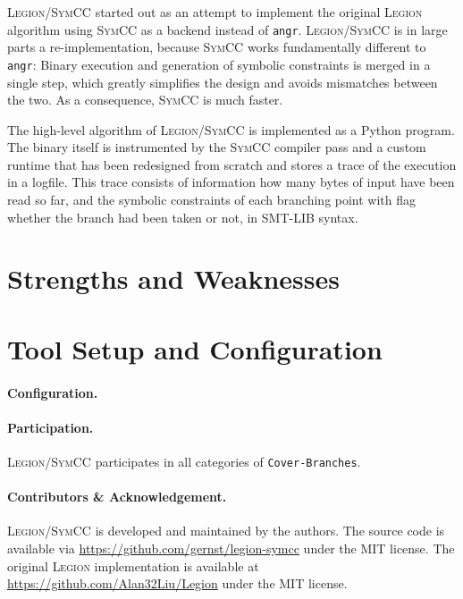 \documentclass{llncs}
\newcommand{\code}[1]{\texttt{#1}}
\newcommand{\Legion}{\textsc{Legion}\xspace}
\newcommand{\SymCC}{\textsc{SymCC}\xspace}
\newcommand{\Angr}{\texttt{angr}\xspace}
\begin{document}
\Legion/\SymCC started out as an attempt to implement the original \Legion algorithm 
using \SymCC as a backend instead of \Angr.
\Legion/\SymCC is in large parts a re-implementation, because \SymCC works fundamentally different to \Angr:
Binary execution and generation of symbolic constraints is merged in a single step, which greatly simplifies the design and avoids mismatches between the two.
As a consequence, \SymCC is much faster.

The high-level algorithm of \Legion/\SymCC is implemented as a Python program.
The binary itself is instrumented by the \SymCC compiler pass and a custom runtime
that has been redesigned from scratch and stores a trace of the execution in a logfile.
This trace consists of information how many bytes of input have been read so far,
and the symbolic constraints of each branching point with flag whether the branch had been taken or not, in SMT-LIB syntax.

\section{Strengths and Weaknesses}
\label{sec:discussion}

\section{Tool Setup and Configuration}
\label{sec:project}


\paragraph{Configuration.}

\paragraph{Participation.}
\Legion/\SymCC participates in all categories of \code{Cover-Branches}.

\paragraph{Contributors \& Acknowledgement.}

\Legion/\SymCC is developed and maintained by the authors.
The source code is available via \url{https://github.com/gernst/legion-symcc} under the MIT license.
The original \Legion implementation is available at \url{https://github.com/Alan32Liu/Legion} under the MIT license.



\end{document}
